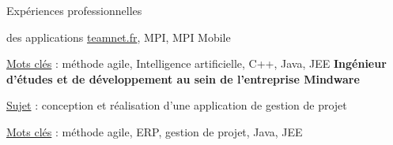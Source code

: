 \begin{rubric}{Expériences professionnelles}
    \par  des applications \href{http://teamnet.fr}{teamnet.fr}, MPI, MPI Mobile
    \hfill {}
    \par \underline{Mots clés} : méthode agile, Intelligence artificielle, C++, Java, JEE
\entry*[]
	\textbf{Ingénieur d'études et de développement au sein de l’entreprise Mindware}
     \hfill{} 
    \par \underline{Sujet} : {conception et réalisation d'une application de gestion de projet}
    \hfill {}
    \par \underline{Mots clés} : méthode agile, ERP, gestion de projet, Java, JEE
      \hfill {}
%
%
%
\end{rubric}

